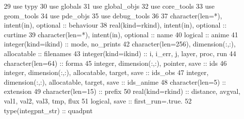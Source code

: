 \begin{DoxyCode}
29       \textcolor{keywordtype}{use }typy
30       \textcolor{keywordtype}{use }globals
31       \textcolor{keywordtype}{use }global_objs
32       \textcolor{keywordtype}{use }core_tools
33       \textcolor{keywordtype}{use }geom_tools
34       \textcolor{keywordtype}{use }pde_objs
35       \textcolor{keywordtype}{use }debug_tools
36 
37       \textcolor{keywordtype}{character(len=*)}, \textcolor{keywordtype}{intent(in)}, \textcolor{keywordtype}{optional}                :: behaviour
38       \textcolor{keywordtype}{real(kind=rkind)}, \textcolor{keywordtype}{intent(in)}, \textcolor{keywordtype}{optional}                :: curtime
39       \textcolor{keywordtype}{character(len=*)}, \textcolor{keywordtype}{intent(in)}, \textcolor{keywordtype}{optional}                :: name
40       \textcolor{keywordtype}{logical}                                               :: anime
41       \textcolor{keywordtype}{integer(kind=ikind)}                                   :: mode, no\_prints
42       \textcolor{keywordtype}{character(len=256)}, \textcolor{keywordtype}{dimension(:,:)}, \textcolor{keywordtype}{allocatable}       :: filenames
43       \textcolor{keywordtype}{integer(kind=ikind)}                                   :: i, i\_err,\textcolor{comment}{ j, layer, proc, run}
44 \textcolor{comment}{      }\textcolor{keywordtype}{character(len=64)}                                     :: forma
45       \textcolor{keywordtype}{integer}, \textcolor{keywordtype}{dimension(:,:)}, \textcolor{keywordtype}{pointer}, \textcolor{keywordtype}{save}                :: ids
46       \textcolor{keywordtype}{integer}, \textcolor{keywordtype}{dimension(:,:)}, \textcolor{keywordtype}{allocatable}, \textcolor{keywordtype}{target}, \textcolor{keywordtype}{save}    :: ids\_obs
47       \textcolor{keywordtype}{integer}, \textcolor{keywordtype}{dimension(:,:)}, \textcolor{keywordtype}{allocatable}, \textcolor{keywordtype}{target}, \textcolor{keywordtype}{save}    :: ids\_anime
48       \textcolor{keywordtype}{character(len=5)}                                      :: extension
49       \textcolor{keywordtype}{character(len=15)}                                     :: prefix
50       \textcolor{keywordtype}{real(kind=rkind)}                                      :: distance,\textcolor{comment}{ avgval, val1, val2, val3, tmp, 
      flux}
51 \textcolor{comment}{      }\textcolor{keywordtype}{logical}, \textcolor{keywordtype}{save}                                         :: first\_run=\textcolor{comment}{.true.}
52 \textcolor{comment}{      }\textcolor{keywordtype}{type}(integpnt_str)                                    :: quadpnt

\end{DoxyCode}
